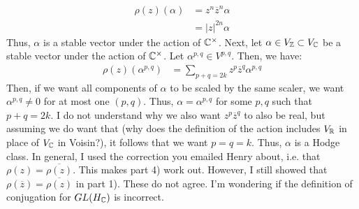 \documentclass[12pt]{article}
\begin{document}
\begin{solution}
\begin{enumerate}
        \begin{align*}
            \rho(z)(\alpha) &= z^n\overline{z}^n \alpha \\
            &= |z|^{2n}\alpha
        \end{align*}
        Thus, $\alpha$ is a stable vector under the action of $\mathbb C^\times$. Next, let $\alpha \in V_\mathbb Z \subset V_\mathbb C$ be a stable vector under the action of $\mathbb C^\times$. Let $\alpha^{p,q} \in V^{p,q}$. Then, we have:
        \begin{align*}
            \rho(z)(\alpha^{p,q}) &=\sum_{p+q=2k} z^p\overline{z}^q \alpha^{p,q}
        \end{align*}
        Then, if we want all components of $\alpha$ to be scaled by the same scaler, we want $\alpha^{p,q} \ne 0$ for at most one $(p,q)$. Thus, $\alpha = \alpha^{p,q}$ for some $p, q$ such that $p+q = 2k$.
        I do not understand why we also want $z^p\overline{z}^q$ to also be real, but assuming we do want that (why does the definition of the action includes $V_\mathbb R$ in place of $V_\mathbb C$ in Voisin?), it follows that we want $p = q = k$. Thus, $\alpha$ is a Hodge class. \bbni 
        In general, I used the correction you emailed Henry about, i.e. that $\rho(z) = \overline{\rho(z)}$. This makes part 4) work out. However, I still showed that $\rho(\overline z) = \overline{\rho(z)}$ in part 1). These do not agree. I'm wondering if the definition of conjugation for $GL(H_\mathbb C)$ is incorrect.
    \end{enumerate}
\end{solution}
\newpage
\end{document}
